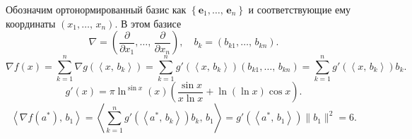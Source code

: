\documentclass[a4paper]{article}
\title{}
\begin{document}
	\maketitle
	Обозначим ортонормированный базис как $\left\{ \mathbf{e}_1,\ldots,\,\mathbf{e}_n \right\} $ и
	соответствующие ему координаты $(x_1,\ldots,\,x_n)$.
В этом базисе
\[
	\nabla = \left( \frac{\partial }{\partial x_1} ,\ldots
	,\, \frac{\partial }{\partial x_n} \right) ,\quad
	b_k= (b_{k1},\ldots,\,b_{kn})
.\]
\[
	\nabla f(x)= \sum_{k=1}^{n} \nabla g\left( \left<
	x,\,b_k\right>  \right) =
	\sum_{k=1}^{n} g'(\left<x,\,b_k \right> ) \left( b_{k 1},\ldots,\,
	b_{kn}\right) =
	\sum_{k=1}^{n} g'(\left<x,\,b_k \right> ) b_k
.\] 
\[
	g'(x)=\pi  \ln ^{\sin x}(x) \left(\frac{\sin x}{x \ln x}+\ln (\ln x) \cos
   x\right)
.\] 
\[
	\left<\nabla f(a^*),\,b_1 \right> =
	\left<\sum_{k=1}^{n} g'(\left<a^*,\,b_k \right> )b_k,\,b_1 \right> 
	=g'\left(\left<a^*,\,b_1 \right> \right)\| b_1\|^2=
	6
.\] 
\end{document}
